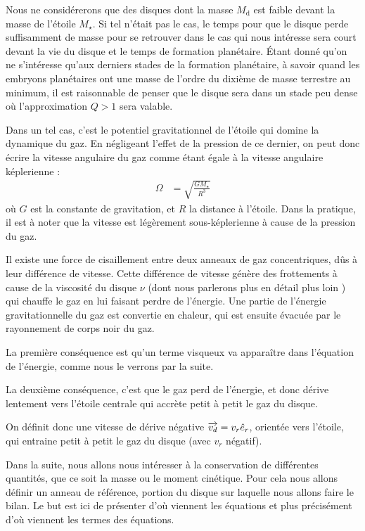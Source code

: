Nous ne considérerons que des disques dont la masse $M_\text{d}$ est faible devant la masse de l'étoile $M_\star$. Si tel n'était pas le cas, le temps pour que le disque perde suffisamment de masse pour se retrouver dans le cas qui nous intéresse sera court devant la vie du disque et le temps de formation planétaire. Étant donné qu'on ne s'intéresse qu'aux derniers stades de la formation planétaire, à savoir quand les embryons planétaires ont une masse de l'ordre du dixième de masse terrestre au minimum, il est raisonnable de penser que le disque sera dans un stade peu dense où l'approximation $Q>1$ sera valable.

Dans un tel cas, c'est le potentiel gravitationnel de l'étoile qui domine la dynamique du gaz. En négligeant l'effet de la pression de ce dernier, on peut donc écrire la vitesse angulaire du gaz comme étant égale à la vitesse angulaire képlerienne : 
\begin{align}
\Omega &= \sqrt{\frac{GM_\star}{R^3}}
\end{align}
où $G$ est la constante de gravitation, et $R$ la distance à l'étoile. Dans la pratique, il est à noter que la vitesse est légèrement sous-képlerienne à cause de la pression du gaz. 

\bigskip

Il existe une force de cisaillement entre deux anneaux de gaz concentriques, dûs à leur différence de vitesse. Cette différence de vitesse génère des frottements à cause de la viscosité du disque $\nu$ (dont nous parlerons plus en détail plus loin ) qui chauffe le gaz en lui faisant perdre de l'énergie. Une partie de l'énergie gravitationnelle du gaz est convertie en chaleur, qui est ensuite évacuée par le rayonnement de corps noir du gaz. 

\bigskip

La première conséquence est qu'un terme visqueux va apparaître dans l'équation de l'énergie, comme nous le verrons par la suite. 

La deuxième conséquence, c'est que le gaz perd de l'énergie, et donc dérive lentement vers l'étoile centrale qui accrète petit à petit le gaz du disque. 

On définit donc une vitesse de dérive négative ${\overrightarrow{v_d}} = v_r \hat{e}_r$, orientée vers l'étoile, qui entraine petit à petit le gaz du disque (avec $v_r$ négatif).

Dans la suite, nous allons nous intéresser à la conservation de différentes quantités, que ce soit la masse ou le moment cinétique. Pour cela nous allons définir un anneau de référence, portion du disque sur laquelle nous allons faire le bilan. Le but est ici de présenter d'où viennent les équations et plus précisément d'où viennent les termes des équations. 

